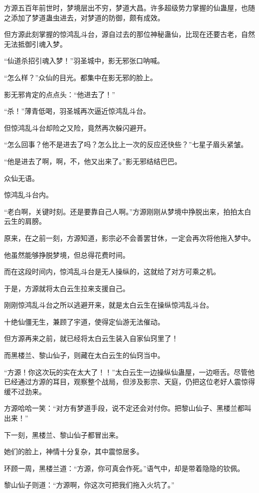 \begin{this_body}
方源五百年前世时，梦境层出不穷，梦道大昌。许多超级势力掌握的仙蛊屋，也随之添加了梦道蛊虫进去，对梦道的防御，颇有成效。

但方源此刻掌握的惊鸿乱斗台，源自过去的那位神秘蛊仙，比现在还要古老，自然无法抵御引魂入梦。

“仙道杀招引魂入梦！”羽圣城中，影无邪张口呐喊。

“怎么样？”众仙的目光。都集中在影无邪的脸上。

影无邪肯定的点点头：“他进去了！”

“杀！”薄青低喝，羽圣城再次逼近惊鸿乱斗台。

但惊鸿乱斗台却险之又险，竟然再次躲闪避开。

“怎么回事？他不是进去了吗？怎么比上一次的反应还快些？”七星子眉头紧皱。

“他是进去了啊，啊，不，他又出来了。”影无邪结结巴巴。

众仙无语。

惊鸿乱斗台内。

“老白啊，关键时刻。还是要靠自己人啊。”方源刚刚从梦境中挣脱出来，拍拍太白云生的肩膀。

原来，在之前一刻，方源知道，影宗必不会善罢甘休，一定会再次将他拖入梦中。

他虽然能够挣脱梦境，但总得花费时间。

而在这段时间内，惊鸿乱斗台是无人操纵的，这就给了对方可乘之机。

于是，方源就将太白云生拉来支援自己。

刚刚惊鸿乱斗台之所以逃避开来，就是太白云生在操纵惊鸿乱斗台。

十绝仙僵无生，兼顾了宇道，使得定仙游无法催动。

但方源再来之前，就已经将太白云生装入自家仙窍里了！

而黑楼兰、黎山仙子，则藏在太白云生的仙窍当中。

“方源！你这次玩的实在太大了！！”太白云生一边操纵仙蛊屋，一边咂舌。尽管他已经通过方源的耳目，观察整个战局，但涉及影宗、天庭，仍把这位老好人震惊得缓不过劲来。

方源哈哈一笑：“对方有梦道手段，说不定还会对付你。把黎山仙子、黑楼兰都叫出来！”

下一刻，黑楼兰、黎山仙子都冒出来。

她们的脸上，神情十分复杂，其中震惊居多。

环顾一周，黑楼兰道：“方源，你可真会作死。”语气中，却是带着隐隐的钦佩。

黎山仙子则道：“方源啊，你这次可把我们拖入火坑了。”


\end{this_body}
